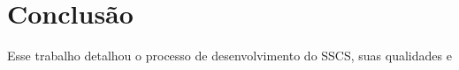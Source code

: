 \documentclass[12pt, %
openright, 
oneside, %
a4paper,    %
brazil]{facom-ufu-abntex2}
\begin{document}
\chapter[Conclusão]{Conclusão}
Esse trabalho detalhou o processo de desenvolvimento do SSCS, suas qualidades e
\postextual












\end{document}
